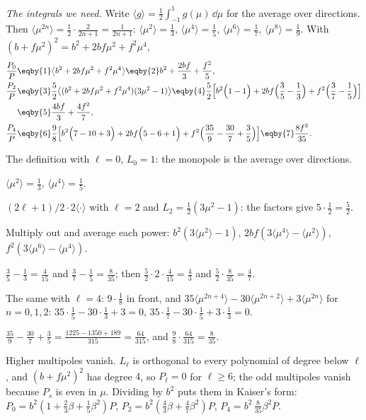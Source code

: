 \emph{The integrals we need.} Write $\langle g\rangle=\frac12\int_{-1}^1g(\mu)\,\dd\mu$
for the average over directions. Then $\langle\mu^{2n}\rangle=\frac12\cdot
\frac{2}{2n+1}=\frac1{2n+1}$: $\langle\mu^2\rangle=\frac13$, $\langle\mu^4\rangle=\frac15$,
$\langle\mu^6\rangle=\frac17$, $\langle\mu^8\rangle=\frac19$. With
$(b+f\mu^2)^2=b^2+2bf\mu^2+f^2\mu^4$,
\begin{align}
  \frac{P_0}{P}
  &\eqby{1}\bigl\langle b^2+2bf\mu^2+f^2\mu^4\bigr\rangle
   \eqby{2}b^2+\frac{2bf}{3}+\frac{f^2}{5},
  \nonumber\\
  \frac{P_2}{P}
  &\eqby{3}\frac52\bigl\langle(b^2+2bf\mu^2+f^2\mu^4)(3\mu^2-1)\bigr\rangle
   \eqby{4}\frac52\Bigl[b^2\Bigl(1-1\Bigr)+2bf\Bigl(\frac35-\frac13\Bigr)
       +f^2\Bigl(\frac37-\frac15\Bigr)\Bigr]
  \nonumber\\
  &\eqby{5}\frac{4bf}{3}+\frac{4f^2}{7},
  \nonumber\\
  \frac{P_4}{P}
  &\eqby{6}\frac98\Bigl[b^2\Bigl(7-10+3\Bigr)+2bf\Bigl(5-6+1\Bigr)
       +f^2\Bigl(\frac{35}9-\frac{30}7+\frac35\Bigr)\Bigr]
   \eqby{7}\frac{8f^2}{35}.
  \label{11a:eq:kaiser-mult}
\end{align}
\begin{explain}
  \item The definition with $\ell=0$, $L_0=1$: the monopole is the average over
        directions.
  \item $\langle\mu^2\rangle=\frac13$, $\langle\mu^4\rangle=\frac15$.
  \item $(2\ell+1)/2\cdot2\langle\cdot\rangle$ with $\ell=2$ and
        $L_2=\frac12(3\mu^2-1)$: the factors give $5\cdot\frac12=\frac52$.
  \item Multiply out and average each power: $b^2(3\langle\mu^2\rangle-1)$,
        $2bf(3\langle\mu^4\rangle-\langle\mu^2\rangle)$,
        $f^2(3\langle\mu^6\rangle-\langle\mu^4\rangle)$.
  \item $\frac35-\frac13=\frac4{15}$ and $\frac37-\frac15=\frac8{35}$; then
        $\frac52\cdot2\cdot\frac4{15}=\frac43$ and $\frac52\cdot\frac8{35}=\frac47$.
  \item The same with $\ell=4$: $9\cdot\frac18$ in front, and
        $35\langle\mu^{2n+4}\rangle-30\langle\mu^{2n+2}\rangle+3\langle\mu^{2n}\rangle$
        for $n=0,1,2$: $35\cdot\frac15-30\cdot\frac13+3=0$,
        $35\cdot\frac17-30\cdot\frac15+3\cdot\frac13=0$.
  \item $\frac{35}9-\frac{30}7+\frac35=\frac{1225-1350+189}{315}=\frac{64}{315}$, and
        $\frac98\cdot\frac{64}{315}=\frac8{35}$.
\end{explain}
Higher multipoles vanish. $L_\ell$ is orthogonal to every polynomial of degree
below $\ell$, and $(b+f\mu^2)^2$ has degree $4$, so $P_\ell=0$ for $\ell\ge6$; the odd
multipoles vanish because $P_s$ is even in $\mu$. Dividing by $b^2$
puts them in Kaiser's form: $P_0=b^2(1+\frac23\beta+\frac15\beta^2)P$,
$P_2=b^2(\frac43\beta+\frac47\beta^2)P$, $P_4=b^2\,\frac8{35}\beta^2P$.

